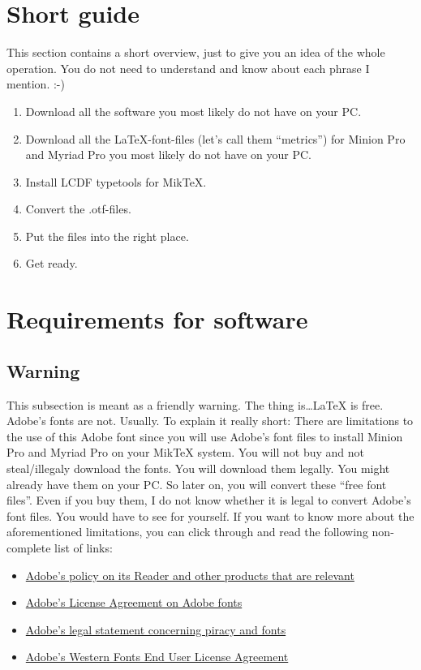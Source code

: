 %

\section{Short guide}

This section contains a short overview, just to give you an idea of the whole operation. You do not need to understand and know about each phrase I mention. :-)

\begin{enumerate}
	\item Download all the software you most likely do not have on your PC.
	\item Download all the \LaTeX{}-font-files (let's call them ``metrics'') for Minion Pro and Myriad Pro you most likely do not have on your PC.
	\item Install LCDF typetools for MikTeX.
	\item Convert the .otf-files.
	\item Put the files into the right place.
	\item Get ready.
\end{enumerate}

\section{Requirements for software}

\subsection{Warning}

This subsection is meant as a friendly warning. The thing is\ldots \LaTeX{} is free. Adobe's fonts are not. Usually. To explain it really short: There are limitations to the use of this Adobe font since you will use Adobe's font files to install Minion Pro and Myriad Pro on your MikTeX system. You will not buy and not steal/illegaly download the fonts. You will download them legally. You might already have them on your PC. So later on, you will convert these ``free font files''. Even if you buy them, I do not know whether it is legal to convert Adobe's font files. You would have to see for yourself. If you want to know more about the aforementioned limitations, you can click through and read the following non-complete list of links:
\begin{itemize}
	\item \href{http://www.adobe.com/products/eulas/}{Adobe's policy on its Reader and other products that are relevant}
	\item \href{http://www.adobe.com/type/browser/legal/index.html}{Adobe's License Agreement on Adobe fonts}
	\item \href{http://www.adobe.com/aboutadobe/antipiracy/fonts.html}{Adobe's legal statement concerning piracy and fonts}
	\item \href{http://www.adobe.com/type/browser/legal/index.html}{Adobe's Western Fonts End User License Agreement}
\end{itemize}


